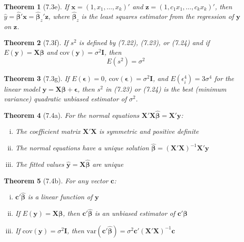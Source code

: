 \documentclass{article}
\newtheorem{theorem}{Theorem}[section]
\begin{document}
\begin{theorem}[7.3e]
If $\mathbf{x} = (1, x_1, \ldots, x_k)'$ and $\mathbf{z} = (1, c_1x_1, \ldots, c_kx_k)'$, then $\hat{y} = \hat{\boldsymbol{\beta}}'\mathbf{x} = \hat{\boldsymbol{\beta}}_z'\mathbf{z}$, where $\hat{\boldsymbol{\beta}}_z$ is the least squares estimator from the regression of $\mathbf{y}$ on $\mathbf{z}$.
\end{theorem}

\begin{theorem}[7.3f]
If $s^2$ is defined by (7.22), (7.23), or (7.24) and if $E(\mathbf{y}) = \mathbf{X}\boldsymbol{\beta}$ and $\text{cov}(\mathbf{y}) = \sigma^2\mathbf{I}$, then
\[E(s^2) = \sigma^2\]
\end{theorem}

\begin{theorem}[7.3g]
If $E(\boldsymbol{\epsilon}) = 0$, $\text{cov}(\boldsymbol{\epsilon}) = \sigma^2\mathbf{I}$, and $E(\epsilon_i^4) = 3\sigma^4$ for the linear model $\mathbf{y} = \mathbf{X}\boldsymbol{\beta} + \boldsymbol{\epsilon}$, then $s^2$ in (7.23) or (7.24) is the best (minimum variance) quadratic unbiased estimator of $\sigma^2$.
\end{theorem}

\begin{theorem}[7.4a]
For the normal equations $\mathbf{X}'\mathbf{X}\hat{\boldsymbol{\beta}} = \mathbf{X}'\mathbf{y}$:
\begin{enumerate}[(i)]
\item The coefficient matrix $\mathbf{X}'\mathbf{X}$ is symmetric and positive definite
\item The normal equations have a unique solution $\hat{\boldsymbol{\beta}} = (\mathbf{X}'\mathbf{X})^{-1}\mathbf{X}'\mathbf{y}$
\item The fitted values $\hat{\mathbf{y}} = \mathbf{X}\hat{\boldsymbol{\beta}}$ are unique
\end{enumerate}
\end{theorem}


\begin{theorem}[7.4b]
For any vector $\mathbf{c}$:
\begin{enumerate}[(i)]
\item $\mathbf{c}'\hat{\boldsymbol{\beta}}$ is a linear function of $\mathbf{y}$
\item If $E(\mathbf{y}) = \mathbf{X}\boldsymbol{\beta}$, then $\mathbf{c}'\hat{\boldsymbol{\beta}}$ is an unbiased estimator of $\mathbf{c}'\boldsymbol{\beta}$
\item If $\text{cov}(\mathbf{y}) = \sigma^2\mathbf{I}$, then $\text{var}(\mathbf{c}'\hat{\boldsymbol{\beta}}) = \sigma^2\mathbf{c}'(\mathbf{X}'\mathbf{X})^{-1}\mathbf{c}$
\end{enumerate}
\end{theorem}
\end{document}
